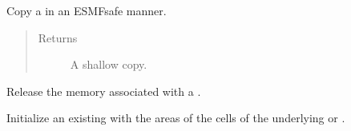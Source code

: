\documentclass[letterpaper,10pt,english]{sphinxmanual}
\begin{document}
\begin{fulllineitems}
\begin{fulllineitems}
\label{\detokenize{field:ESMF.api.field.Field.copy}}
Copy a {\hyperref[\detokenize{field:ESMF.api.field.Field}]{}} in an ESMF\sphinxhyphen{}safe manner.
\begin{quote}\begin{description}
\item[{Returns}] \leavevmode
A {\hyperref[\detokenize{field:ESMF.api.field.Field}]{}} shallow copy.

\end{description}\end{quote}

\end{fulllineitems}


\begin{fulllineitems}
\label{\detokenize{field:ESMF.api.field.Field.destroy}}
Release the memory associated with a {\hyperref[\detokenize{field:ESMF.api.field.Field}]{}}.

\end{fulllineitems}


\begin{fulllineitems}
\label{\detokenize{field:ESMF.api.field.Field.get_area}}
Initialize an existing {\hyperref[\detokenize{field:ESMF.api.field.Field}]{}} with the areas of
the cells of the underlying {\hyperref[\detokenize{grid:ESMF.api.grid.Grid}]{}} or
{\hyperref[\detokenize{mesh:ESMF.api.mesh.Mesh}]{}}.

\end{fulllineitems}



\end{fulllineitems}
\end{document}
